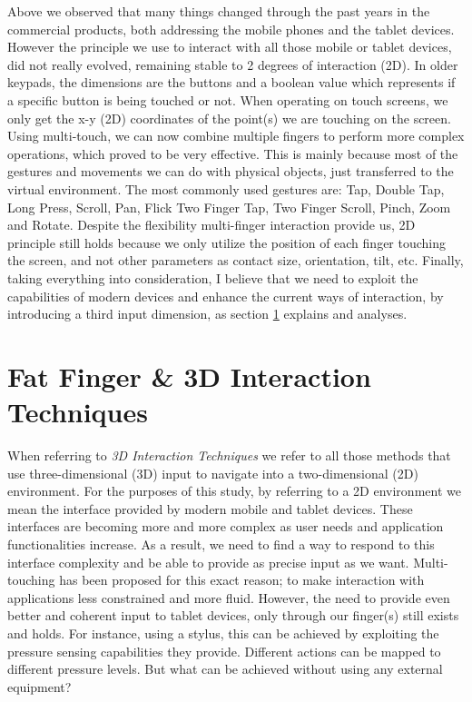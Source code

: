 Above we observed that many things changed through the past years in the commercial products, both addressing the mobile phones and the tablet devices. However  the principle we use to interact with all those mobile or tablet devices, did not really evolved, remaining stable to 2 degrees of interaction (2D).
 In older keypads, the dimensions are the buttons and a boolean value which represents if a specific button is being touched or not.
When operating on touch screens, we only get the x-y (2D) coordinates of the point(s) we are touching on the screen.
Using multi-touch, we can now combine multiple fingers to perform more complex operations, which proved to be very effective. This is mainly because most of the gestures and movements we can do with physical objects, just transferred to the virtual environment. The most commonly used gestures are: Tap, Double Tap, Long Press, Scroll, Pan, Flick Two Finger Tap, Two Finger Scroll,  Pinch, Zoom and Rotate.
Despite the flexibility multi-finger interaction provide us, 2D principle still holds because we only utilize the position of each finger touching the screen, and not other parameters as contact size, orientation, tilt, etc. 
Finally, taking everything into consideration, I believe that we need to exploit the capabilities of modern devices and enhance the current ways of interaction, by introducing a third input dimension, as section \ref{sec:3dInteraction} explains and analyses.

\section{Fat Finger \& 3D Interaction Techniques}
\label{sec:3dInteraction}

When referring to \emph{3D Interaction Techniques} we refer to all those methods that use three-dimensional (3D) input to navigate into a two-dimensional (2D) environment. For the purposes of this study, by referring to a 2D environment we mean the interface provided by modern mobile and tablet devices. These interfaces are becoming more and more complex as user needs and application functionalities increase. As a result, we need to find a way to respond to this interface complexity and be able to provide as precise input as we want. Multi-touching has been proposed for this exact reason; to make interaction with applications less constrained and more fluid. 
However, the need to provide even better and coherent input to tablet devices, only through our finger(s) still exists and holds. For instance, using a stylus, this can be achieved by exploiting the pressure sensing capabilities they provide. Different actions can be mapped to different pressure levels. But what can be achieved without using any external equipment?

